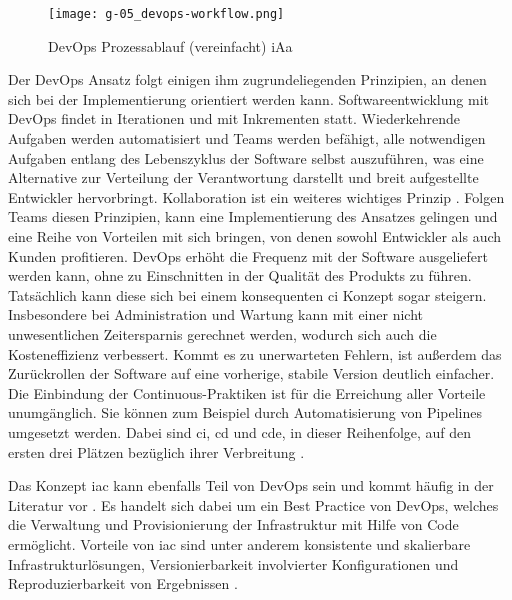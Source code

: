 \begin{figure}[h]
    \centering
    \texttt{[image: g-05\_devops-workflow.png]}
    \caption{DevOps Prozessablauf (vereinfacht) \acrshort{iAa} \citeauthor{008:GitOps-Approach-to-Cloud-Cluster-System-Deployment}}
    \label{fig:g-05_devops-workflow}
\end{figure}

Der DevOps Ansatz folgt einigen ihm zugrundeliegenden Prinzipien, an denen sich bei der Implementierung orientiert werden kann. Softwareentwicklung mit DevOps findet in Iterationen und mit Inkrementen statt. Wiederkehrende Aufgaben werden automatisiert und Teams werden befähigt, alle notwendigen Aufgaben entlang des Lebenszyklus der Software selbst auszuführen, was eine Alternative zur Verteilung der Verantwortung darstellt und breit aufgestellte Entwickler hervorbringt. Kollaboration ist ein weiteres wichtiges Prinzip \cite{009:GitOps-Evolution-of-DevOps}. Folgen Teams diesen Prinzipien, kann eine Implementierung des Ansatzes gelingen und eine Reihe von Vorteilen mit sich bringen, von denen sowohl Entwickler als auch Kunden profitieren. DevOps erhöht die Frequenz mit der Software ausgeliefert werden kann, ohne zu Einschnitten in der Qualität des Produkts zu führen. Tatsächlich kann diese sich bei einem konsequenten \Gls{ci} Konzept sogar steigern. Insbesondere bei Administration und Wartung kann mit einer nicht unwesentlichen Zeitersparnis gerechnet werden, wodurch sich auch die Kosteneffizienz verbessert. Kommt es zu unerwarteten Fehlern, ist außerdem das Zurückrollen der Software auf eine vorherige, stabile Version deutlich einfacher. Die Einbindung der Continuous-Praktiken ist für die Erreichung aller Vorteile unumgänglich. Sie können zum Beispiel durch Automatisierung von Pipelines umgesetzt werden. Dabei sind \acrfull{ci}, \acrfull{cd} und \acrfull{cde}, in dieser Reihenfolge, auf den ersten drei Plätzen bezüglich ihrer Verbreitung \cite{001:DevOps-Adoption-in-Software-Development}.

Das Konzept \Gls{iac} kann ebenfalls Teil von DevOps sein und kommt häufig in der Literatur vor \cite{001:DevOps-Adoption-in-Software-Development}. Es handelt sich dabei um ein Best Practice von DevOps, welches die Verwaltung und Provisionierung der Infrastruktur mit Hilfe von Code ermöglicht. Vorteile von \Gls{iac} sind unter anderem konsistente und skalierbare Infrastrukturlösungen, Versionierbarkeit involvierter Konfigurationen und Reproduzierbarkeit von Ergebnissen \cite{012:Compare-and-Contrast-various-Software-Development-Methodologies}.

